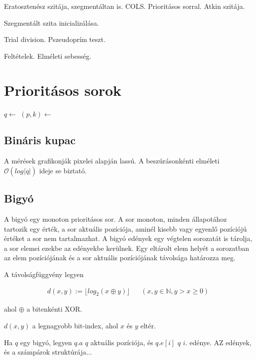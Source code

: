 \documentclass[12pt]{report}
\begin{document}
Eratosztenész szitája, szegmentáltan is. COLS. Prioritásos sorral. Atkin szitája.

Szegmentált szita inicializálása.

Trial division. Pszeudoprím teszt.

Feltételek. Elméleti sebesség.

\section{Prioritásos sorok}

\begin{algorithmic}[1]
\State $q \gets$ 
		\State $(p, k) \gets $ 
		\State {}
		\State {}
	\EndWhile
		\State {}
	\EndIf
\EndFor
\end{algorithmic}

\subsection{Bináris kupac}

A mérések grafikonják pixelei alapján lassú. A beszúrásonkénti elméleti
$\mathcal{O}(log_{}{|q|})$ ideje se biztató.

\subsection{Bigyó}

A bigyó egy monoton prioritásos sor.
A sor monoton, minden állapotához tartozik egy érték, a sor aktuális pozíciója,
aminél kisebb vagy egyenlő pozíciójú értéket a sor nem tartalmazhat.
A bigyó edények egy végtelen sorozatát is tárolja, a sor elemei ezekbe az edényekbe kerülnek.
Egy eltárolt elem helyét a sorozatban az elem pozíciójának
és a sor aktuális pozíciójának távolsága határozza meg.

A távolságfüggvény legyen

\begin{align*}
d(x, y) := \lfloor log_{2}{}(x \oplus y) \rfloor & & (x, y \in \mathbb{N}, y > x \ge 0)
\end{align*}

ahol $\oplus$ a bitenkénti XOR.

$d(x, y)$ a legnagyobb bit-index, ahol $x$ és $y$ eltér.

Ha $q$ egy bigyó, legyen $q.a$ $q$ aktuális pozíciója, és $q.e[i]$ $q$ $i$. edénye. AZ edények, és a számpárok struktúrája...
\end{document}
